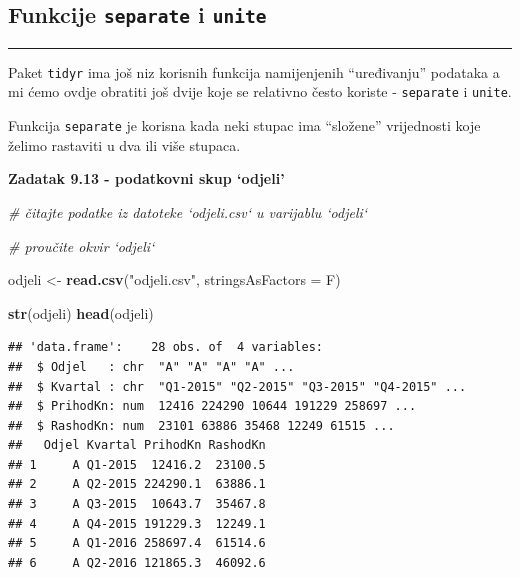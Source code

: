 \documentclass[]{book}
\newenvironment{Shaded}{\begin{snugshade}}{\end{snugshade}}
\newcommand{\KeywordTok}[1]{\textcolor[rgb]{0.13,0.29,0.53}{\textbf{#1}}}
\newcommand{\DataTypeTok}[1]{\textcolor[rgb]{0.13,0.29,0.53}{#1}}
\newcommand{\StringTok}[1]{\textcolor[rgb]{0.31,0.60,0.02}{#1}}
\newcommand{\CommentTok}[1]{\textcolor[rgb]{0.56,0.35,0.01}{\textit{#1}}}
\newcommand{\NormalTok}[1]{#1}
\theoremstyle{definition}
\theoremstyle{definition}
\theoremstyle{definition}
\theoremstyle{remark}
\begin{document}
\subsection{\texorpdfstring{Funkcije \texttt{separate} i
\texttt{unite}}{Funkcije separate i unite}}\label{funkcije-separate-i-unite}

\begin{center}\rule{0.5\linewidth}{\linethickness}\end{center}

Paket \texttt{tidyr} ima još niz korisnih funkcija namijenjenih
``uređivanju'' podataka a mi ćemo ovdje obratiti još dvije koje se
relativno često koriste - \texttt{separate} i \texttt{unite}.

Funkcija \texttt{separate} je korisna kada neki stupac ima ``složene''
vrijednosti koje želimo rastaviti u dva ili više stupaca.

\textbf{Zadatak 9.13 - podatkovni skup `odjeli'}

\begin{Shaded}
\begin{Highlighting}[]
\CommentTok{# čitajte podatke iz datoteke `odjeli.csv` u varijablu `odjeli`}

\CommentTok{# proučite okvir `odjeli`}
\end{Highlighting}
\end{Shaded}

\begin{Shaded}
\begin{Highlighting}[]
\NormalTok{odjeli <-}\StringTok{ }\KeywordTok{read.csv}\NormalTok{(}\StringTok{"odjeli.csv"}\NormalTok{, }\DataTypeTok{stringsAsFactors =}\NormalTok{ F)}

\KeywordTok{str}\NormalTok{(odjeli)}
\KeywordTok{head}\NormalTok{(odjeli)}
\end{Highlighting}
\end{Shaded}

\begin{verbatim}
## 'data.frame':    28 obs. of  4 variables:
##  $ Odjel   : chr  "A" "A" "A" "A" ...
##  $ Kvartal : chr  "Q1-2015" "Q2-2015" "Q3-2015" "Q4-2015" ...
##  $ PrihodKn: num  12416 224290 10644 191229 258697 ...
##  $ RashodKn: num  23101 63886 35468 12249 61515 ...
##   Odjel Kvartal PrihodKn RashodKn
## 1     A Q1-2015  12416.2  23100.5
## 2     A Q2-2015 224290.1  63886.1
## 3     A Q3-2015  10643.7  35467.8
## 4     A Q4-2015 191229.3  12249.1
## 5     A Q1-2016 258697.4  61514.6
## 6     A Q2-2016 121865.3  46092.6
\end{verbatim}
\end{document}
